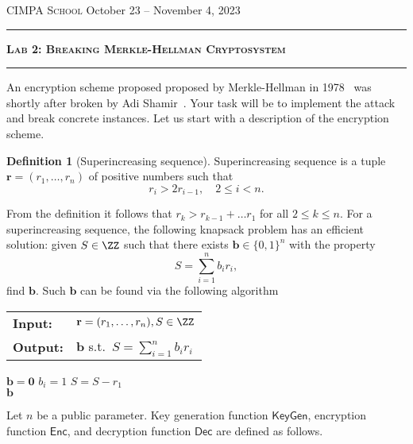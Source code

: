 \documentclass[11pt]{exam}
\theoremstyle{definition}
\newtheorem{definition}[theorem]{Definition}
\let\vec\mathbf
\begin{document}
	{\noindent
		\textsc{CIMPA School}
		\hfill {October 23 -- November 4, 2023\\}
	\hrule
	\begin{center}
		{\Large\textbf{
				\textsc{Lab 2: Breaking Merkle-Hellman Cryptosystem} \\[5pt]
		} } 
	\end{center}
	}
	\hrule \vspace{5mm}
	
	\thispagestyle{empty}
	
	\vspace{0.2cm}
	

An encryption scheme proposed proposed by Merkle-Hellman in 1978~\cite{MH78} was shortly after broken by Adi Shamir~\cite{Shamir}.
Your task will be to implement the attack and break concrete instances. Let us start with a description of the encryption scheme.

\begin{definition}[Superincreasing sequence]
	Superincreasing sequence is a tuple $\vec{r} = (r_1, \ldots, r_n)$ of positive numbers such that
	\[
	r_i > 2r_{i-1}, \quad 2\leq i < n.
	\] 
\end{definition}

From the definition it follows that $r_k > r_{k-1} + \ldots r_1$ for all $2 \leq k \leq n$. For a superincreasing sequence, the following knapsack problem has an efficient solution: given $S \in \ZZ$ such that there exists $\vec b \in \{0,1\}^n$ with the property
\[
	S = \sum_{i=1}^n b_i r_i,
\]
find $\vec b$. Such $\vec b$ can be found via the following algorithm
\begin{algorithm}[H] \caption{Superincreasing knapsack}
	\begin{tabular}{l l}
		\textbf{Input:} 
		& $\vec{r} = (r_1, \ldots, r_n), S \in \ZZ$ \\
		\textbf{Output:} 
		& $\vec b$ s.t.\ $S = \sum_{i=1}^n b_i r_i$ \\
\end{tabular}
	\begin{algorithmic}[1]
		\State $\vec b = \vec 0$
				\State $b_i = 1$
				\State $S = S-r_1$
			\EndIf
		\EndFor \\
		\Return $\vec b$
	\end{algorithmic}
\label{alg:knapsack_superenc}
\caption{Solving superincreasing knapsack}
\end{algorithm}

Let $n$ be a public parameter. Key generation function $\mathsf{KeyGen}$, encryption function  $\mathsf{Enc}$, and decryption function $ \mathsf{Dec}$ are defined as follows.
\end{document}
